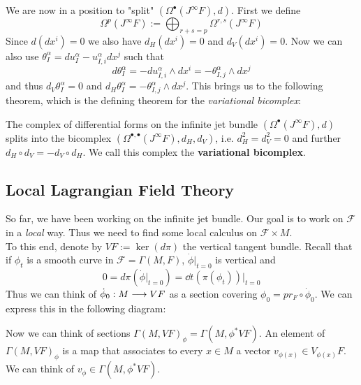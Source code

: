 We are now in a position to "split" $(\Omega^\bullet(J^\infty F), d)$. First we define
$$ \Omega^p (J^\infty F) := \bigoplus_{r+s=p} \Omega^{r,s}(J^\infty F) $$
Since $d(dx^i)=0$ we also have $d_H(dx^i) = 0$ and $d_V(dx^i) = 0$. Now we can also use $\theta^\alpha_I = du^\alpha_I - u^\alpha_{I,i} dx^j$ such that
$$ d \theta^\alpha_I = -d u^\alpha_{I,i} \wedge dx^i = - \theta^\alpha_{I,j} \wedge dx^j $$
and thus $d_V \theta^\alpha_I = 0$ and $d_H \theta^\alpha_I = - \theta^\alpha_{I,j} \wedge dx^j$. This brings us to the following theorem, which is the defining theorem for the \emph{variational bicomplex}:

\begin{theo}
  The complex of differential forms on the infinite jet bundle $(\Omega^\bullet(J^\infty F), d)$ splits into the bicomplex $(\Omega^{\bullet, \bullet}(J^\infty F), d_H, d_V)$, i.e. $d^2_H = d_V^2 = 0$ and further $d_H \circ d_V = -d_V \circ d_H$. We call this complex the \textbf{variational bicomplex}.
\end{theo}


\newpage
\subsection{Local Lagrangian Field Theory}

So far, we have been working on the infinite jet bundle. Our goal is to work on $\mathcal{F}$ in a \emph{local} way. Thus we need to find some local calculus on $\mathcal{F}\times M$.\\

To this end, denote by $VF:=\ker(d\pi)$ the vertical tangent bundle. Recall that if $\phi_t$ is a smooth curve in $\mathcal{F} = \Gamma(M, F)$, $\dot\phi\big|_{t=0}$ is vertical and
$$0 = d\pi(\dot\phi\big|_{t=0}) = \dd{}{t}(\pi(\phi_t))\big|_{t=0}$$
Thus we can think of $\dot \phi_0 : M \lra VF$ as a section covering $\phi_0 = pr_F \circ \dot \phi_0$. We can express this in the following diagram:\\
\begin{center}
\end{center}

Now we can think of sections $\Gamma(M, VF)_\phi = \Gamma(M, \phi^*VF)$. An element of $\Gamma(M, VF)_\phi$ is a map that associates to every $x\in M$ a vector $v_{\phi(x)} \in V_{\phi(x)}F$. We can think of $v_\phi \in \Gamma(M, \phi^*VF)$.

